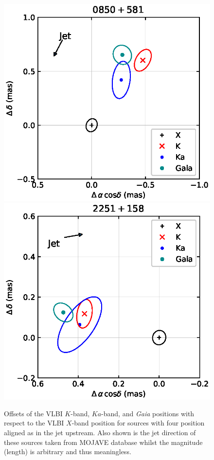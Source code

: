 \documentclass{aa}
\begin{document}
\begin{appendix}
\begin{figure}[hbtp]
        \includegraphics[width=0.45\columnwidth]{figs/0850+581}
        \includegraphics[width=0.45\columnwidth]{figs/2251+158}
        \caption[]{\label{fig:jet-up}
            Offsets of the VLBI $K$-band, $Ka$-band, and {\it Gaia} positions with respect to the VLBI $X$-band position for sources with four position aligned as in the jet upstream.
            Also shown is the jet direction of these sources taken from MOJAVE database whilst the magnitude (length) is arbitrary and thus meaningless.
        }
    \end{figure}



\end{appendix}
\end{document}
